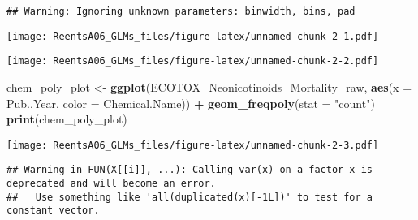\documentclass[]{article}
\newenvironment{Shaded}{\begin{snugshade}}{\end{snugshade}}
\newcommand{\KeywordTok}[1]{\textcolor[rgb]{0.13,0.29,0.53}{\textbf{#1}}}
\newcommand{\DataTypeTok}[1]{\textcolor[rgb]{0.13,0.29,0.53}{#1}}
\newcommand{\StringTok}[1]{\textcolor[rgb]{0.31,0.60,0.02}{#1}}
\newcommand{\CommentTok}[1]{\textcolor[rgb]{0.56,0.35,0.01}{\textit{#1}}}
\newcommand{\OperatorTok}[1]{\textcolor[rgb]{0.81,0.36,0.00}{\textbf{#1}}}
\newcommand{\NormalTok}[1]{#1}
\begin{document}
\begin{verbatim}
## Warning: Ignoring unknown parameters: binwidth, bins, pad
\end{verbatim}

\texttt{[image: ReentsA06\_GLMs\_files/figure-latex/unnamed-chunk-2-1.pdf]}

\begin{Shaded}
\end{Shaded}

\texttt{[image: ReentsA06\_GLMs\_files/figure-latex/unnamed-chunk-2-2.pdf]}

\begin{Shaded}
\begin{Highlighting}[]
\NormalTok{chem_poly_plot <-}\StringTok{ }\KeywordTok{ggplot}\NormalTok{(ECOTOX_Neonicotinoids_Mortality_raw, }\KeywordTok{aes}\NormalTok{(}\DataTypeTok{x =}\NormalTok{ Pub..Year, }\DataTypeTok{color =}\NormalTok{ Chemical.Name)) }\OperatorTok{+}
\StringTok{  }\KeywordTok{geom_freqpoly}\NormalTok{(}\DataTypeTok{stat =} \StringTok{"count"}\NormalTok{)}
\KeywordTok{print}\NormalTok{(chem_poly_plot)}
\end{Highlighting}
\end{Shaded}

\texttt{[image: ReentsA06\_GLMs\_files/figure-latex/unnamed-chunk-2-3.pdf]}

\begin{Shaded}
\end{Shaded}

\begin{verbatim}
## Warning in FUN(X[[i]], ...): Calling var(x) on a factor x is deprecated and will become an error.
##   Use something like 'all(duplicated(x)[-1L])' to test for a constant vector.
\end{verbatim}
\end{document}
